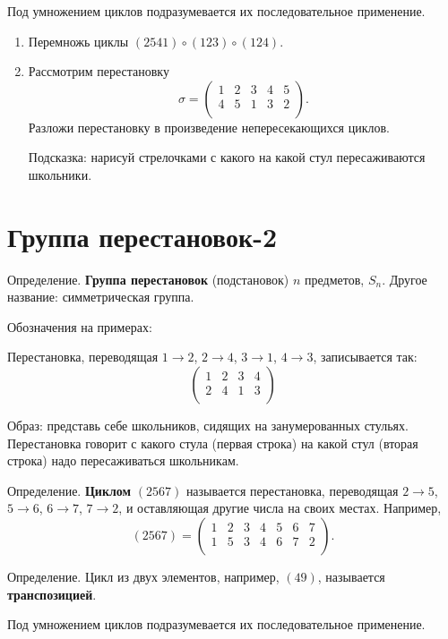\documentclass[12pt]{article} %
\begin{document}
Под умножением циклов подразумевается их последовательное применение.

\begin{enumerate}
\item Перемножь циклы $(2541)\circ(123)\circ(124)$.
\item Рассмотрим перестановку
\[
\sigma = \begin{pmatrix}
  1 & 2 & 3 & 4 & 5 \\
  4 & 5 & 1 & 3 & 2 \\
\end{pmatrix}.
\]
Разложи перестановку в произведение непересекающихся циклов.

Подсказка: нарисуй стрелочками с какого на какой стул пересаживаются школьники.
\end{enumerate}

\newpage
\section{Группа перестановок-2}

Определение. \textbf{Группа перестановок} (подстановок) $n$ предметов, $S_n$. Другое название: симметрическая группа.

Обозначения на примерах:

Перестановка, переводящая $1\to 2$, $2\to 4$, $3\to 1$, $4\to 3$, записывается так:
\[
\begin{pmatrix}
  1 & 2 & 3 & 4 \\
  2 & 4 & 1 & 3 \\
\end{pmatrix}
\]

Образ: представь себе школьников, сидящих на занумерованных стульях. Перестановка говорит с какого стула (первая строка) на какой стул (вторая строка) надо пересаживаться школьникам.

Определение. \textbf{Циклом} $(2567)$ называется перестановка, переводящая $2\to 5$, $5 \to 6$, $6\to 7$, $7\to 2$, и оставляющая другие числа на своих местах. Например,
\[
(2567) =
\begin{pmatrix}
1 & 2 & 3 & 4 & 5 & 6 & 7 \\
1 & 5 & 3 & 4 & 6 & 7 & 2 \\
\end{pmatrix}.
\]

Определение. Цикл из двух элементов, например, $(49)$, называется \textbf{транспозицией}.

Под умножением циклов подразумевается их последовательное применение.
\end{document}
